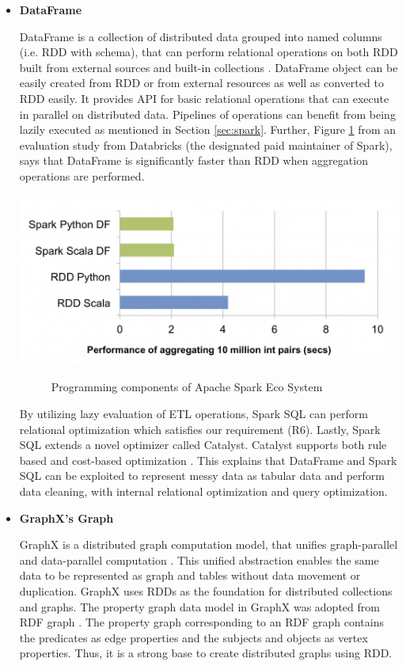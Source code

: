 \begin{itemize}
\item \textbf{DataFrame} 

DataFrame is a collection of distributed data grouped into named columns (i.e. RDD with schema), that can perform relational operations on both RDD built from external sources and built-in collections \cite{SparkSQL}. DataFrame object can be easily created from RDD or from external resources as well as converted to RDD easily. It provides API for basic relational operations that can execute in parallel on distributed data.  Pipelines of operations can benefit from being lazily executed as mentioned in Section \ref{sec:spark}. Further, Figure \ref{fig:rdd-vs-dataframe} from an evaluation study from Databricks \cite{databricks-dataframe}(the designated paid maintainer of Spark), says that DataFrame is significantly faster than RDD when aggregation operations are performed.
\begin{center}
	\includegraphics[width=38em]{./Figures/rdd-vs-dataframe}
	\begin{figure}[htbp]
    \caption{Programming components of Apache Spark Eco System \cite{databricks-dataframe} }
    \label{fig:rdd-vs-dataframe}
	\end{figure}
\end{center}
By utilizing lazy evaluation of ETL operations, Spark SQL can perform relational optimization \cite{SparkSQL} which satisfies our requirement (R6). Lastly, Spark SQL extends a novel optimizer called Catalyst. Catalyst supports both rule based and cost-based optimization \cite{SparkSQL}. This explains that DataFrame and Spark SQL can be exploited to represent messy data as tabular data and perform data cleaning, with internal relational optimization and query optimization.
\item \textbf{GraphX's Graph }

GraphX is a distributed graph computation model, that unifies graph-parallel and data-parallel computation \cite{GraphX}. This unified abstraction enables the same data to be represented as graph and tables without data movement or duplication. GraphX uses RDDs as the foundation for distributed collections and graphs. The property graph data model in GraphX was adopted from RDF graph \cite{RDFinGraphX}. The property graph corresponding to an RDF graph contains the predicates as edge properties and the subjects and objects as vertex properties. Thus, it is a strong base to create distributed graphs using RDD. 
\end{itemize}
